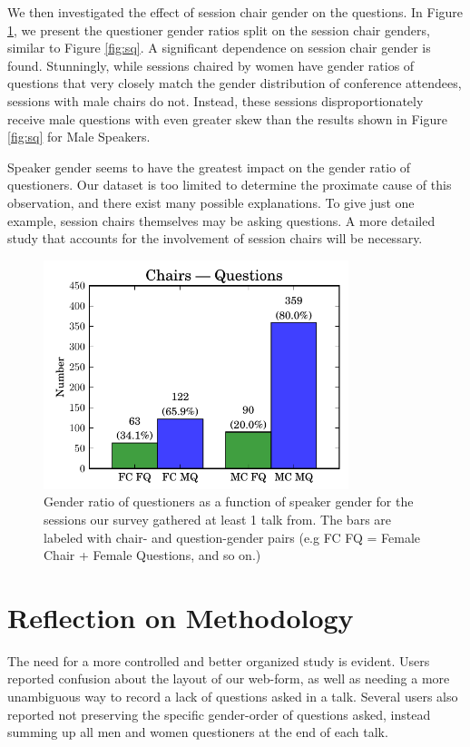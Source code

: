 \documentclass[iop]{emulateapj}
\begin{document}
We then investigated the effect of session chair gender on the questions. In Figure \ref{fig:chairs}, we present the questioner gender ratios split on the session chair genders, similar to Figure \ref{fig:sq}. A significant dependence on session chair gender is found. Stunningly, while sessions chaired by women  have gender ratios of questions that very closely match the gender distribution of conference attendees, sessions with male chairs do not. Instead, these sessions disproportionately receive male questions with even greater skew than the results shown in Figure \ref{fig:sq} for Male Speakers. 

Speaker gender seems to have the greatest impact on the gender ratio of questioners. Our dataset is too limited to determine the proximate cause of this observation, and there exist many possible explanations. To give just one example, session chairs themselves may be asking questions. A more detailed study that accounts for the involvement of session chairs will be necessary.




\begin{figure}[!t]
\centering
\includegraphics[width=3.5in]{chairs_questions}
\caption{Gender ratio of questioners as a function of speaker gender for the sessions our survey gathered at least 1 talk from. The bars are labeled with chair- and question-gender pairs (e.g FC FQ = Female Chair + Female Questions, and so on.)}
\label{fig:chairs}
\end{figure}



\section{Reflection on Methodology}
The need for a more controlled and better organized study is evident. Users reported confusion about the layout of our web-form, as well as needing a more unambiguous way to record a lack of questions asked in a talk. Several users also reported not preserving the specific gender-order of questions asked, instead summing up all men and women questioners at the end of each talk.
\end{document}
